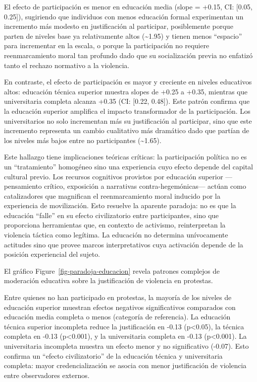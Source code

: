 \documentclass[
  13pt,
]{article}
\begin{document}
El efecto de participación es menor en educación media (slope = +0.15,
CI: {[}0.05, 0.25{]}), sugiriendo que individuos con menos educación
formal experimentan un incremento más modesto en justificación al
participar, posiblemente porque parten de niveles base ya relativamente
altos (\textasciitilde1.95) y tienen menos ``espacio'' para incrementar
en la escala, o porque la participación no requiere reenmarcamiento
moral tan profundo dado que su socialización previa no enfatizó tanto el
rechazo normativo a la violencia.

En contraste, el efecto de participación es mayor y creciente en niveles
educativos altos: educación técnica superior muestra slopes de +0.25 a
+0.35, mientras que universitaria completa alcanza +0.35 (CI: {[}0.22,
0.48{]}). Este patrón confirma que la educación superior amplifica el
impacto transformador de la participación. Los universitarios no solo
incrementan más su justificación al participar, sino que este incremento
representa un cambio cualitativo más dramático dado que partían de los
niveles más bajos entre no participantes (\textasciitilde1.65).

Este hallazgo tiene implicaciones teóricas críticas: la participación
política no es un ``tratamiento'' homogéneo sino una experiencia cuyo
efecto depende del capital cultural previo. Los recursos cognitivos
provistos por educación superior ---pensamiento crítico, exposición a
narrativas contra-hegemónicas--- actúan como catalizadores que
magnifican el reenmarcamiento moral inducido por la experiencia de
movilización. Esto resuelve la aparente paradoja: no es que la educación
``falle'' en su efecto civilizatorio entre participantes, sino que
proporciona herramientas que, en contexto de activismo, reinterpretan la
violencia táctica como legítima. La educación no determina unívocamente
actitudes sino que provee marcos interpretativos cuya activación depende
de la posición experiencial del sujeto.

El gráfico Figure~\ref{fig-paradoja-educacion} revela patrones complejos
de moderación educativa sobre la justificación de violencia en
protestas.

Entre quienes no han participado en protestas, la mayoría de los niveles
de educación superior muestran efectos negativos significativos
comparados con educación media completa o menos (categoría de
referencia). La educación técnica superior incompleta reduce la
justificación en -0.13 (p\textless0.05), la técnica completa en -0.13
(p\textless0.001), y la universitaria completa en -0.13
(p\textless0.001). La universitaria incompleta muestra un efecto menor y
no significativo (-0.07). Esto confirma un ``efecto civilizatorio'' de
la educación técnica y universitaria completa: mayor credencialización
se asocia con menor justificación de violencia entre observadores
externos.
\end{document}
